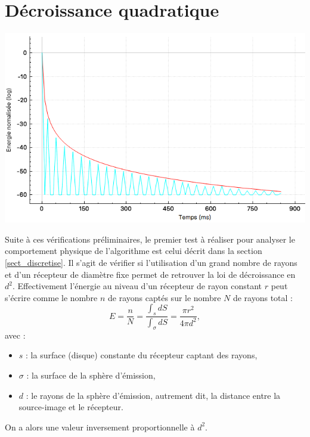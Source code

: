 \begin{figureth}
\begin{subfigureth}{0.45\textwidth}
		\caption{Propagation des rayons depuis les sources-images vers le récepteur à l'ordre 1.}
		\label{testBeam2}
	\end{subfigureth}
	\caption{Visualisation des rayons captés par le récepteur à l'ordre 0 (gauche) et 1 (droite) pour 100~000 rayons au total.}
	\label{testBeam}
\end{figureth}




\section{Décroissance quadratique}


\begin{figureth}
	\includegraphics[width=0.8\linewidth]{images/test1}
	\caption{Réponse impulsionnelle en espace libre pour 3 millions de rayons (bleu) échantillonnée à 100Hz et fonction $f(d)=\frac{2}{d^2}$ (rouge).}
	\label{test1}
\end{figureth}


Suite à ces vérifications préliminaires, le premier test à réaliser pour analyser le comportement physique de l'algorithme est celui décrit dans la section \ref{sect_discretise}. Il s'agit de vérifier si l'utilisation d'un grand nombre de rayons et d'un récepteur de diamètre fixe permet de retrouver la loi de décroissance en $d^2$. Effectivement l'énergie au niveau d'un récepteur de rayon constant $r$ peut s'écrire comme le nombre $n$ de rayons captés sur le nombre $N$ de rayons total :
\begin{equation}
E = \frac{n}{N} = \frac{\int_s dS}{\int_{\sigma} dS} = \frac{\pi r^2}{4\pi d^2},
\end{equation}
avec :
\begin{itemize}
\item$s$ : la surface (disque) constante du récepteur captant des rayons,
\item$\sigma$ : la surface de la sphère d'émission,
\item$d$ : le rayons de la sphère d'émission, autrement dit, la distance entre la source-image et le récepteur.
\end{itemize}
On a alors une valeur inversement proportionnelle à $d^2$.

